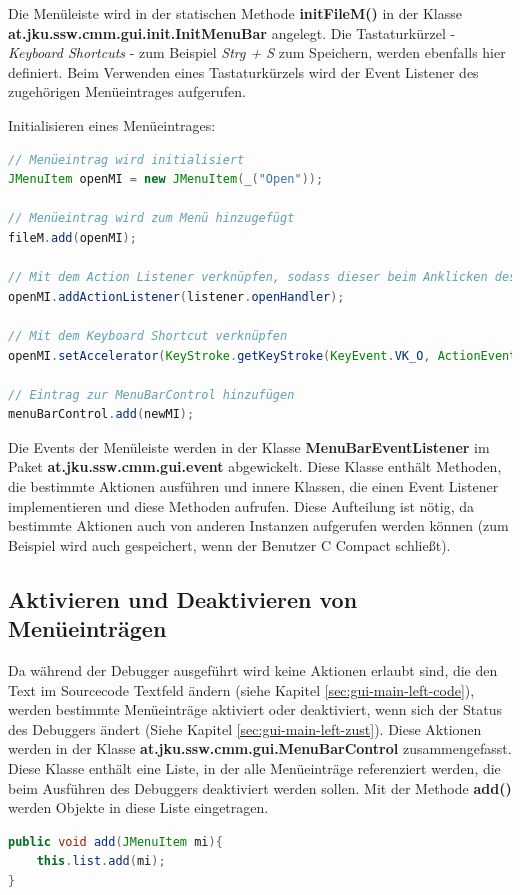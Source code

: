 Die Menüleiste wird in der statischen Methode \textbf{initFileM()} in der Klasse \\ \textbf{at.jku.ssw.cmm.gui.init.InitMenuBar} angelegt. Die Tastaturkürzel - \emph{\glqq{}Keyboard Shortcuts\grqq{}} - zum Beispiel \emph{Strg + S} zum Speichern, werden ebenfalls hier definiert. Beim Verwenden eines Tastaturkürzels wird der Event Listener des zugehörigen Menüeintrages aufgerufen.

Initialisieren eines Menüeintrages:
\begin{lstlisting}[language=JAVA]
// Menüeintrag wird initialisiert
JMenuItem openMI = new JMenuItem(_("Open"));

// Menüeintrag wird zum Menü hinzugefügt
fileM.add(openMI);

// Mit dem Action Listener verknüpfen, sodass dieser beim Anklicken des Menüs aufgerufen wird
openMI.addActionListener(listener.openHandler);

// Mit dem Keyboard Shortcut verknüpfen
openMI.setAccelerator(KeyStroke.getKeyStroke(KeyEvent.VK_O, ActionEvent.CTRL_MASK));

// Eintrag zur MenuBarControl hinzufügen
menuBarControl.add(newMI);
\end{lstlisting}

Die Events der Menüleiste werden in der Klasse \textbf{MenuBarEventListener} im Paket \textbf{at.jku.ssw.cmm.gui.event} abgewickelt. Diese Klasse enthält Methoden, die bestimmte Aktionen ausführen und innere Klassen, die einen Event Listener implementieren und diese Methoden aufrufen. Diese Aufteilung ist nötig, da bestimmte Aktionen auch von anderen Instanzen aufgerufen werden können (zum Beispiel wird auch gespeichert, wenn der Benutzer C Compact schließt).

\subsection{Aktivieren und Deaktivieren von Menüeinträgen}
\label{sec:gui-main-menu-ctrl}
Da während der Debugger ausgeführt wird keine Aktionen erlaubt sind, die den Text im Sourcecode Textfeld ändern (siehe Kapitel \ref{sec:gui-main-left-code}), werden bestimmte Menüeinträge aktiviert oder deaktiviert, wenn sich der Status des Debuggers ändert (Siehe Kapitel \ref{sec:gui-main-left-zust}). Diese Aktionen werden in der Klasse \textbf{at.jku.ssw.cmm.gui.MenuBarControl} zusammengefasst. Diese Klasse enthält eine Liste, in der alle Menüeinträge referenziert werden, die beim Ausführen des Debuggers deaktiviert werden sollen. Mit der Methode \textbf{add()} werden Objekte in diese Liste eingetragen.
\begin{lstlisting}[language=JAVA]
public void add(JMenuItem mi){
	this.list.add(mi);
}
\end{lstlisting}

